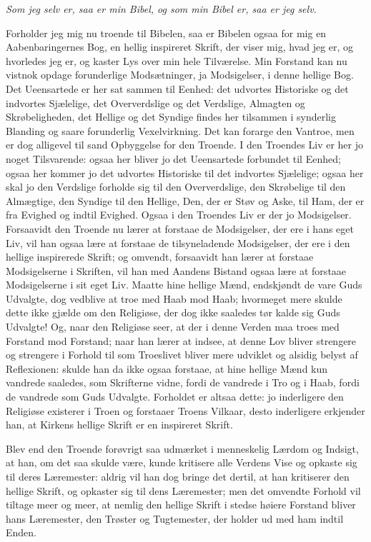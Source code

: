 \documentclass[12pt,a4paper]{book}
\newcommand{\opage}[1]{\marginnote{\footnotesize\textit{[#1]}}}
\begin{document}
\emph{Som jeg selv er, saa er min Bibel, og som min Bibel er, saa er jeg selv.}

Forholder jeg mig nu troende til Bibelen, saa er Bibelen ogsaa for mig en
Aabenbaringernes Bog, en hellig inspireret Skrift, der viser mig, hvad jeg er,
og hvorledes jeg er, og kaster Lys over min hele Tilværelse. Min Forstand kan
nu vistnok opdage forunderlige Modsætninger, ja Modsigelser, i denne hellige
Bog. Det Ueensartede er her sat sammen til Eenhed: det udvortes Historiske og
det indvortes Sjælelige, det Oververdslige og det Verdslige, Almagten og
Skrøbeligheden, det Hellige og det Syndige findes her tilsammen i synderlig
Blanding og saare forunderlig Vexelvirkning. Det kan forarge den Vantroe, men
er dog alligevel til sand Opbyggelse for den Troende. I den Troendes Liv er her
jo noget Tilsvarende: ogsaa her bliver jo det Ueensartede forbundet til Eenhed;
ogsaa her kommer jo det udvortes Historiske til det indvortes Sjælelige; ogsaa
her skal jo den Verdslige forholde sig til den Oververdslige, den Skrøbelige
til den Almægtige, den Syndige til den Hellige, Den, der er Støv og Aske, til
Ham, der er fra Evighed og indtil Evighed. Ogsaa i den Troendes Liv er der jo
Modsigelser. Forsaavidt den Troende nu lærer at forstaae de Modsigelser, der
ere i hans eget Liv, vil han ogsaa lære at forstaae de tilsyneladende
Modsigelser, der ere i den hellige inspirerede Skrift; og omvendt, forsaavidt
han lærer at forstaae Modsigelserne i Skriften, vil han med Aandens Bistand
ogsaa lære at forstaae Modsigelserne i sit
\opage{41} eget Liv. Maatte hine hellige Mænd, endskjøndt de vare Guds Udvalgte, dog
vedblive at troe med Haab mod Haab; hvormeget mere skulde dette ikke gjælde om
den Religiøse, der dog ikke saaledes tør kalde sig Guds Udvalgte! Og, naar den
Religiøse seer, at der i denne Verden maa troes med Forstand mod Forstand; naar
han lærer at indsee, at denne Lov bliver strengere og strengere i Forhold til
som Troeslivet bliver mere udviklet og alsidig belyst af Reflexionen: skulde
han da ikke ogsaa forstaae, at hine hellige Mænd kun vandrede saaledes, som
Skrifterne vidne, fordi de vandrede i Tro og i Haab, fordi de vandrede som Guds
Udvalgte. Forholdet er altsaa dette: jo inderligere den Religiøse existerer i
Troen og forstaaer Troens Vilkaar, desto inderligere erkjender han, at Kirkens
hellige Skrift er en inspireret Skrift.

Blev end den Troende forøvrigt saa udmærket i menneskelig Lærdom og Indsigt, at
han, om det saa skulde være, kunde kritisere alle Verdens Vise og opkaste sig
til deres Læremester: aldrig vil han dog bringe det dertil, at han kritiserer
den hellige Skrift, og opkaster sig til dens Læremester; men det omvendte
Forhold vil tiltage meer og meer, at nemlig den hellige Skrift i stedse høiere
Forstand bliver hans Læremester, den Trøster og Tugtemester, der holder ud med
ham indtil Enden.
\end{document}
